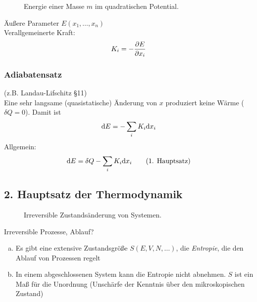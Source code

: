 \begin{enumerate}[a)]
          \begin{figure}[H]
        \centering
        \def\svgwidth{0.4\textwidth}
        
        \caption{Energie einer Masse $m$ im quadratischen Potential.}
        \label{img:controlledDeltaWork}
    \end{figure}
    
    Äußere Parameter $E(x_1, \ldots, x_n)$ \\
    Verallgemeinerte Kraft:
    \begin{equation}
        K_i = - \frac{\partial E}{\partial x_i}
    \end{equation}
\end{enumerate}
\subsubsection{Adiabatensatz}
(z.B. Landau-Lifschitz §11) \\
Eine sehr langsame (quasistatische) Änderung von $x$ produziert keine Wärme ($\delta Q = 0$). Damit ist
\begin{equation}
    \mathrm{d} E = - \sum_i K_i \mathrm{d} x_i
\end{equation}
Allgemein:
\begin{equation}
    \mathrm{d} E = \delta Q - \sum_i K_i \mathrm{d} x_i \qquad \text{(1. Hauptsatz)}
\end{equation}

\subsection{2. Hauptsatz der Thermodynamik}
 
          \begin{figure}[H]
        \centering
        \def\svgwidth{0.85\textwidth}
        
        \caption{Irreversible Zustandsänderung von Systemen.}
        \label{img:irrevProcess}
    \end{figure}
    
Irreversible Prozesse, Ablauf?
\begin{enumerate}[a)]
    \item Es gibt eine extensive Zustandsgröße $S(E, V, N, \ldots)$, die \emph{Entropie}, die den Ablauf von Prozessen regelt
    \item In einem abgeschlossenen System kann die Entropie nicht abnehmen. $S$ ist ein Maß für die Unordnung
    (Unschärfe der Kenntnis über den mikroskopischen Zustand)
\end{enumerate}

